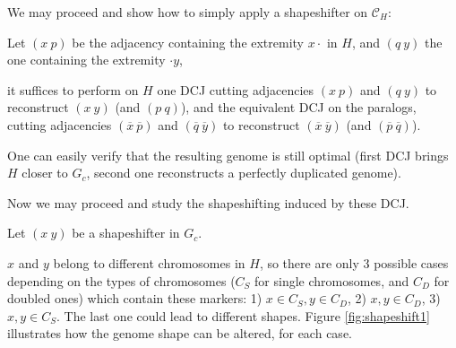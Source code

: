 \documentclass[11pt,final,twoside,nofrench]{thlifl}
\newcommand{\fst}[1]{ \ensuremath{#1} }
\newcommand{\snd}[1]{ \ensuremath{\overline{#1}} }
\newcommand\aff[2]{\ensuremath{(\fst{#1}~\fst{#2})}}
\newcommand\ass[2]{\ensuremath{(\snd{#1}~\snd{#2})}}
\begin{document}
We may proceed and show how to simply apply a shapeshifter on $\mathcal{C}_H$:

Let \aff{x}{p} be the adjacency containing the extremity $x\cdot$ in
$H$, and \aff{q}{y} the one containing the extremity $\cdot y$,

it suffices to perform on $H$ one DCJ cutting adjacencies \aff{x}{p}
and \aff{q}{y} to reconstruct \aff{x}{y} (and \aff{p}{q}), and the
equivalent DCJ on the paralogs, cutting adjacencies \ass{x}{p} and
\ass{q}{y} to reconstruct \ass{x}{y} (and \ass{p}{q}).

One can easily verify that the resulting genome is still optimal (first DCJ brings $H$ closer to $G_c$, second one reconstructs a perfectly duplicated genome). 

Now we may proceed and study the shapeshifting induced by these DCJ.

Let \aff{x}{y} be a shapeshifter in $G_c$.

$x$ and $y$ belong to different chromosomes in $H$, so there are only
3 possible cases depending on the types of chromosomes ($C_S$ for
single chromosomes, and $C_D$ for doubled ones) which contain these
markers: 1) {$x \in C_S, y \in C_D$}, 2) {$x,y \in C_D$}, 3) {$x,y \in
  C_S$}. The last one could lead to different shapes. Figure
\ref{fig:shapeshift1} illustrates how the genome shape can be altered,
for each case.
\end{document}
